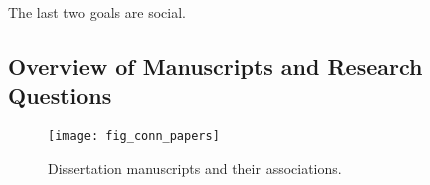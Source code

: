 The last two goals are social.



\subsection{Overview of Manuscripts and Research Questions}
\label{subsec:conn-papers}

\begin{figure}[p]
\texttt{[image: fig\_conn\_papers]}\vspace{1em}
\caption[Dissertation manuscripts and their associations]
{Dissertation manuscripts and their associations.}
\label{fig:conn_papers}
\end{figure}

